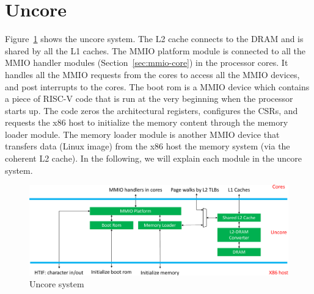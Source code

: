 \documentclass[12pt]{article}
\begin{document}
















































\section{Uncore}\label{sec:uncore}

Figure~\ref{fig:uncore} shows the uncore system.
The L2 cache connects to the DRAM and is shared by all the L1 caches.
The MMIO platform module is connected to all the MMIO handler modules (Section~\ref{sec:mmio-core}) in the processor cores.
It handles all the MMIO requests from the cores to access all the MMIO devices, and post interrupts to the cores.
The boot rom is a MMIO device which contains a piece of RISC-V code that is run at the very beginning when the processor starts up.
The code zeros the architectural registers, configures the CSRs, and requests the x86 host to initialize the memory content through the memory loader module.
The memory loader module is another MMIO device that transfers data (Linux image) from the x86 host the memory system (via the coherent L2 cache).
In the following, we will explain each module in the uncore system.

\begin{figure}[!htb]
    \centering
    \includegraphics[width=\columnwidth]{fig/uncore_crop.pdf}
    \caption{Uncore system}\label{fig:uncore}
\end{figure}
\end{document}
